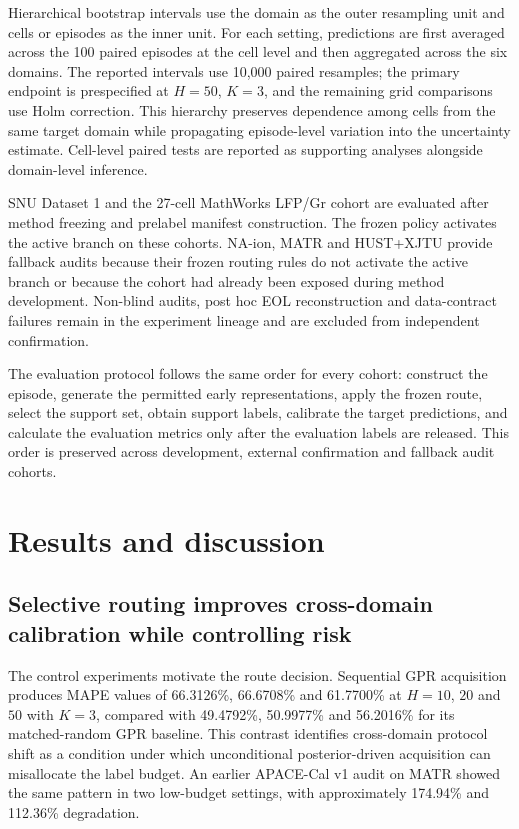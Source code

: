 \documentclass[preprint,12pt]{elsarticle}
\begin{document}
Hierarchical bootstrap intervals use the domain as the outer resampling unit and cells or episodes as the inner unit. For each setting, predictions are first averaged across the 100 paired episodes at the cell level and then aggregated across the six domains. The reported intervals use 10,000 paired resamples; the primary endpoint is prespecified at $H=50$, $K=3$, and the remaining grid comparisons use Holm correction. This hierarchy preserves dependence among cells from the same target domain while propagating episode-level variation into the uncertainty estimate. Cell-level paired tests are reported as supporting analyses alongside domain-level inference.

SNU Dataset 1 and the 27-cell MathWorks LFP/Gr cohort are evaluated after method freezing and prelabel manifest construction. The frozen policy activates the active branch on these cohorts. NA-ion, MATR and HUST+XJTU provide fallback audits because their frozen routing rules do not activate the active branch or because the cohort had already been exposed during method development. Non-blind audits, post hoc EOL reconstruction and data-contract failures remain in the experiment lineage and are excluded from independent confirmation.

The evaluation protocol follows the same order for every cohort: construct the episode, generate the permitted early representations, apply the frozen route, select the support set, obtain support labels, calibrate the target predictions, and calculate the evaluation metrics only after the evaluation labels are released. This order is preserved across development, external confirmation and fallback audit cohorts.

\section{Results and discussion}
\label{sec:results}

\subsection{Selective routing improves cross-domain calibration while controlling risk}

The control experiments motivate the route decision. Sequential GPR acquisition produces MAPE values of 66.3126\%, 66.6708\% and 61.7700\% at $H=10$, $20$ and $50$ with $K=3$, compared with 49.4792\%, 50.9977\% and 56.2016\% for its matched-random GPR baseline. This contrast identifies cross-domain protocol shift as a condition under which unconditional posterior-driven acquisition can misallocate the label budget. An earlier APACE-Cal v1 audit on MATR showed the same pattern in two low-budget settings, with approximately 174.94\% and 112.36\% degradation.
\end{document}
